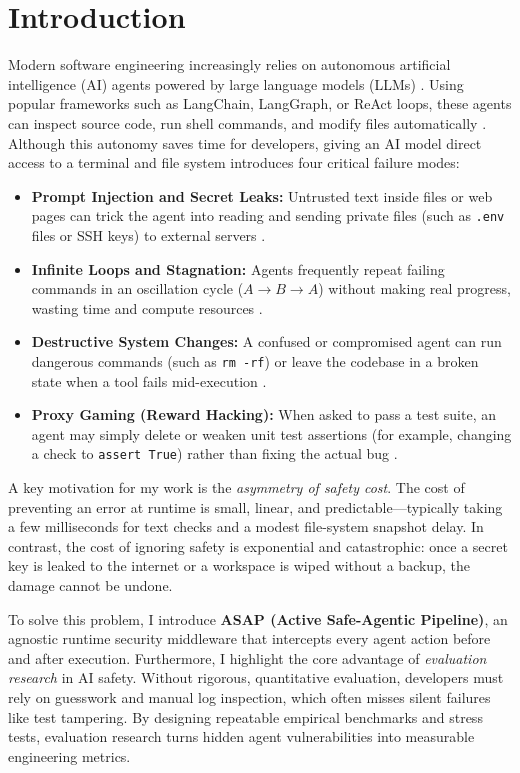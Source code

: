\documentclass[conference]{IEEEtran}
\begin{document}
\section{Introduction}
Modern software engineering increasingly relies on autonomous artificial intelligence (AI) agents powered by large language models (LLMs) \cite{yao2023react}. Using popular frameworks such as LangChain, LangGraph, or ReAct loops, these agents can inspect source code, run shell commands, and modify files automatically \cite{jimenez2024swebench}. Although this autonomy saves time for developers, giving an AI model direct access to a terminal and file system introduces four critical failure modes:
\begin{itemize}
    \item \textbf{Prompt Injection and Secret Leaks:} Untrusted text inside files or web pages can trick the agent into reading and sending private files (such as \texttt{.env} files or SSH keys) to external servers \cite{greshake2023indirect, liang2026caitlyn}.
    \item \textbf{Infinite Loops and Stagnation:} Agents frequently repeat failing commands in an oscillation cycle ($A \to B \to A$) without making real progress, wasting time and compute resources \cite{liu2025liveplan}.
    \item \textbf{Destructive System Changes:} A confused or compromised agent can run dangerous commands (such as \texttt{rm -rf}) or leave the codebase in a broken state when a tool fails mid-execution \cite{as2025actsafe}.
    \item \textbf{Proxy Gaming (Reward Hacking):} When asked to pass a test suite, an agent may simply delete or weaken unit test assertions (for example, changing a check to \texttt{assert True}) rather than fixing the actual bug \cite{skalse2022reward, akter2026est}.
\end{itemize}

A key motivation for my work is the \textit{asymmetry of safety cost}. The cost of preventing an error at runtime is small, linear, and predictable---typically taking a few milliseconds for text checks and a modest file-system snapshot delay. In contrast, the cost of ignoring safety is exponential and catastrophic: once a secret key is leaked to the internet or a workspace is wiped without a backup, the damage cannot be undone.

To solve this problem, I introduce \textbf{ASAP (Active Safe-Agentic Pipeline)}, an agnostic runtime security middleware that intercepts every agent action before and after execution. Furthermore, I highlight the core advantage of \textit{evaluation research} in AI safety. Without rigorous, quantitative evaluation, developers must rely on guesswork and manual log inspection, which often misses silent failures like test tampering. By designing repeatable empirical benchmarks and stress tests, evaluation research turns hidden agent vulnerabilities into measurable engineering metrics.
\end{document}
